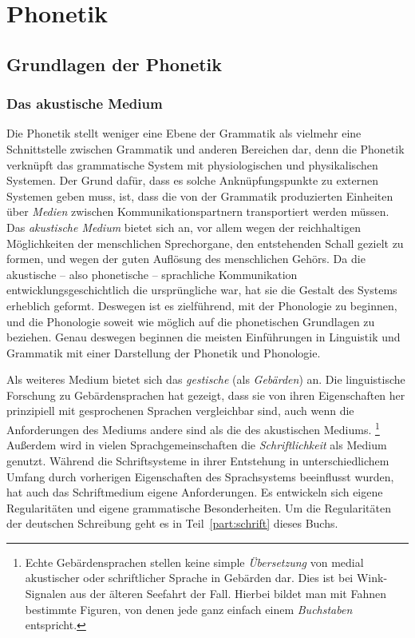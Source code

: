 \chapter{Phonetik}

\label{sec:phonetik}

\section{Grundlagen der Phonetik}

\subsection{Das akustische Medium}

\label{sec:akustischemedium}


Die Phonetik stellt weniger eine Ebene der Grammatik als vielmehr eine Schnittstelle zwischen Grammatik und anderen Bereichen dar, denn die Phonetik verknüpft das grammatische System mit physiologischen und physikalischen Systemen.
Der Grund dafür, dass es solche Anknüpfungspunkte zu externen Systemen geben muss, ist, dass die von der Grammatik produzierten Einheiten über \textit{Medien} zwischen Kommunikationspartnern transportiert werden müssen.
Das \textit{akustische Medium} bietet sich an, vor allem wegen der reichhaltigen Möglichkeiten der menschlichen Sprechorgane, den entstehenden Schall gezielt zu formen, und wegen der guten Auflösung des menschlichen Gehörs.
Da die akustische -- also phonetische -- sprachliche Kommunikation entwicklungsgeschichtlich die ursprüngliche war, hat sie die Gestalt des Systems erheblich geformt.
Deswegen ist es zielführend, mit der Phonologie zu beginnen, und die Phonologie soweit wie möglich auf die phonetischen Grundlagen zu beziehen.
Genau deswegen beginnen die meisten Einführungen in Linguistik und Grammatik mit einer Darstellung der Phonetik und Phonologie.

Als weiteres Medium bietet sich das \textit{gestische} (als \textit{Gebärden}) an.
Die linguistische Forschung zu Gebärdensprachen hat gezeigt, dass sie von ihren Eigenschaften her prinzipiell mit gesprochenen Sprachen vergleichbar sind, auch wenn die Anforderungen des Mediums andere sind als die des akustischen Mediums.%
\footnote{Echte Gebärdensprachen stellen keine simple \textit{Übersetzung} von medial akustischer oder schriftlicher Sprache in Gebärden dar.
Dies ist \zB bei Wink-Signalen aus der älteren Seefahrt der Fall.
Hierbei bildet man mit Fahnen bestimmte Figuren, von denen jede ganz einfach einem \textit{Buchstaben} entspricht.}
Außerdem wird in vielen Sprachgemeinschaften die \textit{Schriftlichkeit} als Medium genutzt.
Während die Schriftsysteme in ihrer Entstehung in unterschiedlichem Umfang durch vorherigen Eigenschaften des Sprachsystems beeinflusst wurden, hat auch das Schriftmedium eigene Anforderungen.
Es entwickeln sich eigene Regularitäten und eigene grammatische Besonderheiten.
Um die Regularitäten der deutschen Schreibung geht es in Teil~\ref{part:schrift} dieses Buchs.

